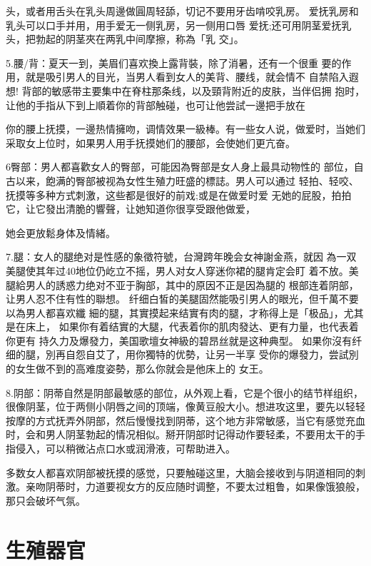 \documentclass[12pt,UTF8]{ctexbook}
\begin{document}
头，或者用舌头在乳头周邊做圓周轻舔，切记不要用牙齿啃咬乳房。
爱抚乳房和乳头可以口手并用，用手爱无一侧乳房，另一侧用口唇
爱抚;还可用阴茎爱抚乳头，把勃起的阴茎夾在两乳中间摩擦，称為「乳
交」。

5.腰/背：夏天一到，美眉们喜欢換上露背裝，除了消暑，还有一个很重
要的作用，就是吸引男人的目光，当男人看到女人的美背、腰线，就会情不
自禁陷入遐想!
背部的敏感带主要集中在脊柱那条线，以及頸背附近的皮肤，当伴侣拥
抱时，让他的手指从下到上順着你的背部触碰，也可让他尝試一邊把手放在

你的腰上抚摸，一邊热情擁吻，调情效果一級棒。有一些女人说，做爱时，当她们采取女上位时，如果男人用手抚摸她们的腰部，会使她们更亢奋。

6臀部：男人都喜歡女人的臀部，可能因為臀部是女人身上最具动物性的
部位，自古以来，飽满的臀部被视為女性生殖力旺盛的標誌。男人可以通过
轻拍、轻咬、抚摸等多种方式刺激，这些都是很好的前戏;或是在做爱时爱
无她的屁股，拍拍它，让它發出清脆的響聲，让她知道你很享受跟他做爱，

她会更放鬆身体及情緒。

7.腿：女人的腿绝对是性感的象徵符號，台灣跨年晚会女神謝金燕，就因
為一双美腿使其年过40地位仍屹立不摇，男人对女人穿迷你裙的腿肯定会盯
着不放。美腿給男人的誘惑力绝对不亚于胸部，其中的原因不正是因為腿的
根部连着阴部，让男人忍不住有性的聯想。
纤细白皙的美腿固然能吸引男人的眼光，但千萬不要以為男人都喜欢纖
細的腿，其實摸起来结實有肉的腿，才称得上是「极品」，尤其是在床上，
如果你有着结實的大腿，代表着你的肌肉發达、更有力量，也代表着你更有
持久力及爆發力，美国歌壇女神級的碧昂丝就是这种典型。
如果你沒有纤细的腿，別再自怨自艾了，用你獨特的优勢，让另一半享
受你的爆發力，尝試別的女生做不到的高难度姿勢，那么你就会是他床上的
女王。

8.阴部：阴蒂自然是阴部最敏感的部位，从外观上看，它是个很小的结节样组织，很像阴茎，位于两侧小阴唇之间的顶端，像黄豆般大小。想进攻这里，要先以轻轻按摩的方式抚弄外阴部，然后慢慢找到阴蒂，这个地方非常敏感，当它有感觉充血时，会和男人阴茎勃起的情况相似。掰开阴部时记得动作要轻柔，不要用太干的手指侵入，可以稍微沾点口水或润滑液，可帮助进入。

多数女人都喜欢阴部被抚摸的感觉，只要触碰这里，大脑会接收到与阴道相同的刺激。亲吻阴蒂时，力道要视女方的反应随时调整，不要太过粗鲁，如果像饿狼般，那只会破坏气氛。


\mainmatter

\part{生殖器官}
\end{document}
